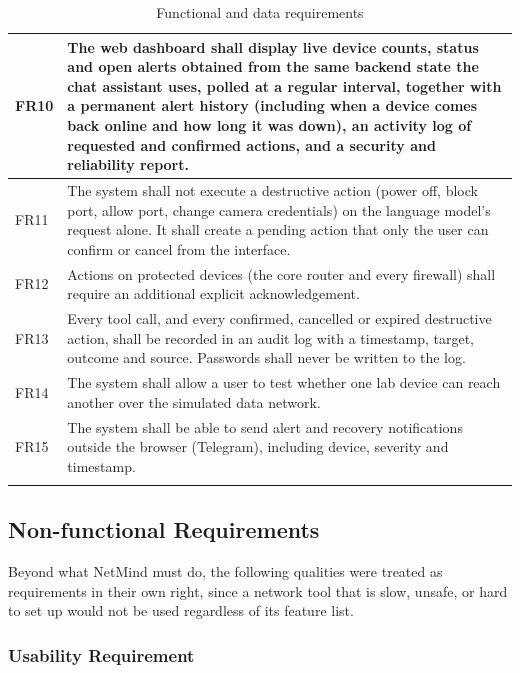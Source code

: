 {\begin{xltabular}{\textwidth}{|p{1.1cm}|Y|}
FR10 & The web dashboard shall display live device counts, status and open alerts obtained from the same backend state the chat assistant uses, polled at a regular interval, together with a permanent alert history (including when a device comes back online and how long it was down), an activity log of requested and confirmed actions, and a security and reliability report. \\ \hline
FR11 & The system shall not execute a destructive action (power off, block port, allow port, change camera credentials) on the language model's request alone. It shall create a pending action that only the user can confirm or cancel from the interface. \\ \hline
FR12 & Actions on protected devices (the core router and every firewall) shall require an additional explicit acknowledgement. \\ \hline
FR13 & Every tool call, and every confirmed, cancelled or expired destructive action, shall be recorded in an audit log with a timestamp, target, outcome and source. Passwords shall never be written to the log. \\ \hline
FR14 & The system shall allow a user to test whether one lab device can reach another over the simulated data network. \\ \hline
FR15 & The system shall be able to send alert and recovery notifications outside the browser (Telegram), including device, severity and timestamp. \\ \hline
\caption{Functional and data requirements}\label{tab:fr}\\
\end{xltabular}}

\subsection{Non-functional Requirements}

Beyond what NetMind must do, the following qualities were treated as
requirements in their own right, since a network tool that is slow, unsafe,
or hard to set up would not be used regardless of its feature list.

\subsubsection{Usability Requirement}

